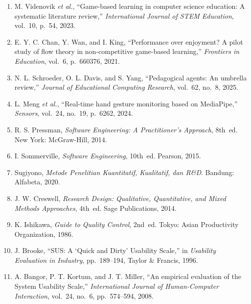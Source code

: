 \documentclass[10pt,twoside,openright]{report}
\begin{document}
\begin{enumerate}
    \item[{[12]}] M. Videnovik \textit{et al.}, ``Game-based learning in computer science education: A systematic literature review,'' \textit{International Journal of STEM Education}, vol.~10, p.~54, 2023.
    \item[{[13]}] E. Y. C. Chan, Y. Wan, and I. King, ``Performance over enjoyment? A pilot study of flow theory in non-competitive game-based learning,'' \textit{Frontiers in Education}, vol.~6, p.~660376, 2021.
    \item[{[14]}] N. L. Schroeder, O. L. Davis, and S. Yang, ``Pedagogical agents: An umbrella review,'' \textit{Journal of Educational Computing Research}, vol.~62, no.~8, 2025.
    \item[{[15]}] L. Meng \textit{et al.}, ``Real-time hand gesture monitoring based on MediaPipe,'' \textit{Sensors}, vol.~24, no.~19, p.~6262, 2024.
    \item[{[16]}] R. S. Pressman, \textit{Software Engineering: A Practitioner's Approach}, 8th~ed. New York: McGraw-Hill, 2014.
    \item[{[17]}] I. Sommerville, \textit{Software Engineering}, 10th~ed. Pearson, 2015.
    \item[{[18]}] Sugiyono, \textit{Metode Penelitian Kuantitatif, Kualitatif, dan R\&D}. Bandung: Alfabeta, 2020.
    \item[{[19]}] J. W. Creswell, \textit{Research Design: Qualitative, Quantitative, and Mixed Methods Approaches}, 4th~ed. Sage Publications, 2014.
    \item[{[20]}] K. Ishikawa, \textit{Guide to Quality Control}, 2nd~ed. Tokyo: Asian Productivity Organization, 1986.
    \item[{[21]}] J. Brooke, ``SUS: A `Quick and Dirty' Usability Scale,'' in \textit{Usability Evaluation in Industry}, pp.~189--194, Taylor \& Francis, 1996.
    \item[{[22]}] A. Bangor, P. T. Kortum, and J. T. Miller, ``An empirical evaluation of the System Usability Scale,'' \textit{International Journal of Human-Computer Interaction}, vol.~24, no.~6, pp.~574--594, 2008.
\end{enumerate}
\end{document}

